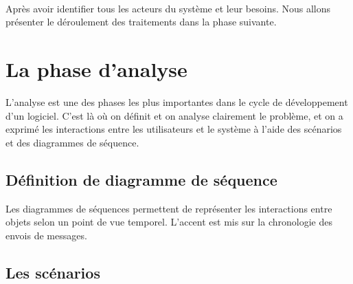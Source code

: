 \paragraph{\\}

Après avoir identifier tous les acteurs du système et leur besoins. Nous allons présenter le déroulement des traitements dans la phase suivante.



\newpage 

\section{La phase d'analyse}
L'analyse est une des phases les plus importantes dans le cycle de développement d'un logiciel. C'est là où on définit et on analyse clairement le problème, et on a exprimé les interactions entre les utilisateurs et le système à l'aide des scénarios et des diagrammes de séquence.
\subsection{Définition de diagramme de séquence }
Les diagrammes de séquences permettent de représenter les interactions entre objets selon un point de vue temporel. L'accent est mis sur la chronologie des envois de messages.
\subsection{Les scénarios}
